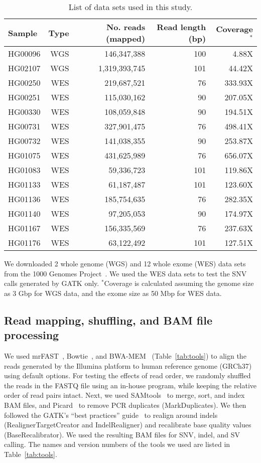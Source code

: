 \documentclass[10pt,a4paper]{article}
\begin{document}
\begin{table}[htb]
\caption{List of data sets used in this study.}
\begin{center}
\begin{tabular}{|l|r|r|r|r|}
\hline
{\bf Sample} & {\bf Type} & {\bf No. reads (mapped)} & {\bf Read length (bp)} & {\bf Coverage$^*$}\\
\hline
HG00096 & WGS & 146,347,388 & 100 & 4.88X\\
HG02107 & WGS & 1,319,393,745 & 101 & 44.42X\\
\hline
HG00250 & WES & 219,687,521 & 76 & 333.93X \\ 
HG00251 & WES & 115,030,162 & 90 & 207.05X \\ 
HG00330 & WES & 108,059,848 & 90 & 194.51X \\ 
HG00731 & WES & 327,901,475 & 76 & 498.41X \\ 
HG00732 & WES & 141,038,355 & 90 & 253.87X \\ 
HG01075 & WES & 431,625,989 & 76 & 656.07X \\ 
HG01083 & WES & 59,336,723 & 101 & 119.86X \\ 
HG01133 & WES & 61,187,487 & 101 & 123.60X \\ 
HG01136 & WES & 185,754,635 & 76 & 282.35X \\ 
HG01140 & WES & 97,205,053 & 90 & 174.97X \\ 
HG01167 & WES & 156,335,569 & 76 & 237.63X \\ 
HG01176 & WES & 63,122,492 & 101 & 127.51X \\ 
\hline
\end{tabular}
\end{center}
{\footnotesize We downloaded 2 whole genome (WGS) and 12 whole exome (WES) data sets from the 1000 Genomes Project~\cite{1000GP2012}. We
  used the WES data sets to test the SNV calls generated by GATK only.
  $^*$Coverage is calculated assuming the genome size as 3 Gbp for WGS data, and the exome size as 50 Mbp for WES data.}
\label{tab:data}
\end{table}


\subsection{Read mapping, shuffling, and BAM file processing}
We used mrFAST~\cite{Alkan2009,Xin2013}, Bowtie~\cite{Langmead2009}, and BWA-MEM~\cite{Li2009a,Li2013} (Table~\ref{tab:tools}) to align the reads generated by the Illumina 
platform to human reference genome (GRCh37) using default options. For testing the effects of read order, we randomly 
shuffled the reads in the FASTQ file using an in-house program, while keeping the relative order of read pairs intact.
Next, we used SAMtools~\cite{Li2009b} to merge, sort, and index BAM files, and Picard~\cite{picard} to remove PCR duplicates (MarkDuplicates).
We then followed the GATK's ``best practices'' guide~\cite{VanderAuwera2013} to
realign around indels (RealignerTargetCreator and IndelRealigner) and recalibrate base quality values (BaseRecalibrator). We used the 
resulting BAM files for SNV, indel, and SV calling. The names and version numbers of the tools we used are listed in Table~\ref{tab:tools}.
\end{document}
